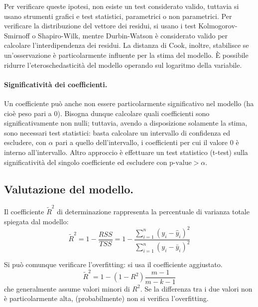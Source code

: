 \documentclass[11pt, a4page, twocolumn]{article}
\begin{document}
Per verificare queste ipotesi, non esiste un test considerato valido, tuttavia si usano strumenti grafici e test statistici, parametrici o non parametrici. \newline
Per verificare la distribuzione del vettore dei residui, si usano i test Kolmogorov-Smirnoff o Shapiro-Wilk, mentre Durbin-Watson è considerato valido per calcolare l'interdipendenza dei residui.
La distanza di Cook, inoltre, stabilisce se un'osservazione è particolarmente influente per la stima del modello. \newline
È possibile ridurre l'eteroschedasticità del modello operando sul logaritmo della variabile. \newline

\paragraph{Significatività dei coefficienti.}
Un coefficiente può anche non essere particolarmente significativo nel modello (ha cioè peso pari a $0$).
Bisogna dunque calcolare quali coefficienti sono significativamente non nulli; tuttavia, avendo a disposizione solamente la stima, sono necessari test statistici: basta calcolare un intervallo di confidenza ed escludere, con $ \alpha$ pari a quello dell'intervallo, i coefficienti per cui il valore $0$ è interno all'intervallo.
Altro approccio è effettuare un test statistico (t-test) sulla significatività del singolo coefficiente ed escludere con $\text{p-value} > \alpha$.

\subsection{Valutazione del modello.}
Il coefficiente $\tilde{R}^2$ di determinazione rappresenta la percentuale di varianza totale spiegata dal modello:
\begin{equation*}
  \tilde{R}^2 = 1 - \frac{RSS}{TSS} = 1 - \frac{\sum^n_{i=1}{(y_i -
      \hat{y}_i)^2}}{\sum^n_{i=1}{(y_i - \bar{y}_i)^2}}
\end{equation*}

Si può comunque verificare l'overfitting: si usa il coefficiente aggiustato.
\begin{equation*}
  \tilde{R}^2 = 1 - (1 - R^2)\frac{m-1}{m-k-1}
\end{equation*}
che generalmente assume valori minori di $R^2$.
Se la differenza tra i due valori non è particolarmente alta, (probabilmente) non si verifica l'overfitting. \newline
\end{document}
